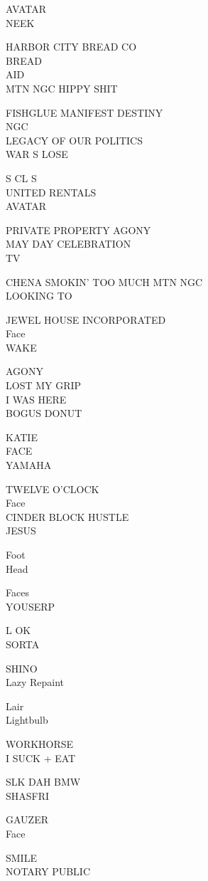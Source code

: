 \documentclass[10pt,letterpaper]{article}
\begin{document}
AVATAR\\
NEEK

HARBOR CITY BREAD CO\\
BREAD\\
AID\\
MTN NGC HIPPY SHIT

FISHGLUE MANIFEST DESTINY\\
NGC\\
LEGACY OF OUR POLITICS\\
WAR S LOSE

S CL S\\
UNITED RENTALS\\
AVATAR

PRIVATE PROPERTY AGONY\\
MAY DAY CELEBRATION\\
TV

CHENA SMOKIN' TOO MUCH MTN NGC\\
LOOKING TO

JEWEL HOUSE INCORPORATED\\
Face\\
WAKE

AGONY\\
LOST MY GRIP\\
I WAS HERE\\
BOGUS DONUT

KATIE\\
FACE\\
YAMAHA

TWELVE O'CLOCK\\
Face\\
CINDER BLOCK HUSTLE\\
JESUS

Foot\\
Head

Faces\\
YOUSERP

L OK\\
SORTA

SHINO\\
Lazy Repaint

Lair\\
Lightbulb

WORKHORSE\\
I SUCK + EAT

SLK DAH BMW\\
SHASFRI

GAUZER\\
Face

SMILE\\
NOTARY PUBLIC
\end{document}
